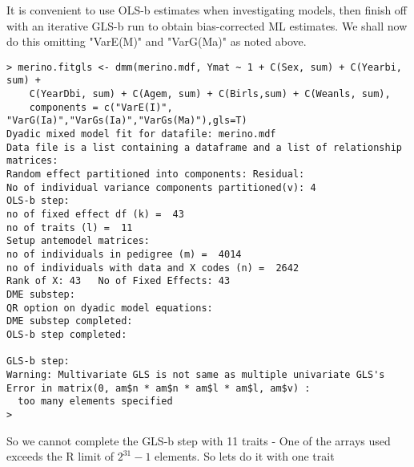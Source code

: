 \documentclass[titlepage]{article}  %
\begin{document}
It is convenient to use OLS-b estimates when investigating models, then finish off with an iterative GLS-b run to obtain bias-corrected ML estimates. We shall now do this omitting "VarE(M)" and "VarG(Ma)" as noted above.

\begin{verbatim}
> merino.fitgls <- dmm(merino.mdf, Ymat ~ 1 + C(Sex, sum) + C(Yearbi, sum) +
    C(YearDbi, sum) + C(Agem, sum) + C(Birls,sum) + C(Weanls, sum),
    components = c("VarE(I)", "VarG(Ia)","VarGs(Ia)","VarGs(Ma)"),gls=T)
Dyadic mixed model fit for datafile: merino.mdf  
Data file is a list containing a dataframe and a list of relationship matrices:
Random effect partitioned into components: Residual:
No of individual variance components partitioned(v): 4 
OLS-b step:
no of fixed effect df (k) =  43 
no of traits (l) =  11 
Setup antemodel matrices:
no of individuals in pedigree (m) =  4014 
no of individuals with data and X codes (n) =  2642 
Rank of X: 43   No of Fixed Effects: 43 
DME substep:
QR option on dyadic model equations:
DME substep completed:
OLS-b step completed:

GLS-b step:
Warning: Multivariate GLS is not same as multiple univariate GLS's
Error in matrix(0, am$n * am$n * am$l * am$l, am$v) : 
  too many elements specified
> 
\end{verbatim}
 So we cannot complete the GLS-b step with 11 traits - One of the arrays used exceeds the R limit of $2^{31} - 1$ elements. So lets do it with one trait
\end{document}

